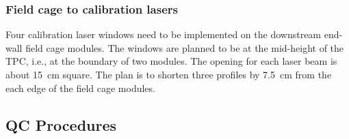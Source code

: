 

\subsubsection{Field cage to calibration lasers}

Four calibration laser windows need to be implemented on the downstream end-wall field cage modules.  The windows are planned to be at the mid-height of the TPC, i.e., at the boundary of two %
modules.  The opening for each laser beam is about 15~cm square.  The plan is to shorten three profiles by 7.5~cm from the each edge of the field cage modules.



\subsection{QC Procedures}

 


